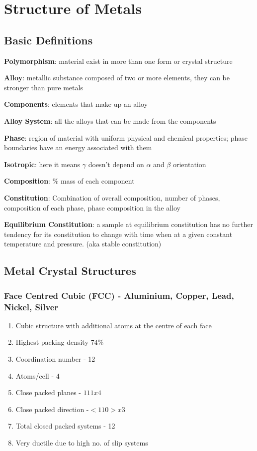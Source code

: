 \section{Structure of Metals}
\subsection{Basic Definitions}

\textbf{Polymorphism}: material exist in more than one form or crystal structure

\textbf{Alloy}: metallic substance composed of two or more elements, they can be stronger than pure metals

\textbf{Components}: elements that make up an alloy

\textbf{Alloy System}: all the alloys that can be made from the components

\textbf{Phase}: region of material with uniform physical and chemical properties; phase boundaries have an energy associated with them

\textbf{Isotropic}: here it means $\gamma$ doesn't depend on $\alpha$ and $\beta$ orientation

\textbf{Composition}: \% mass of each component

\textbf{Constitution}: Combination of overall composition, number of phases, composition of each phase, phase composition in the alloy

\textbf{Equilibrium Constitution}: a sample at equilibrium constitution has no further tendency for its constitution to change with time when at a given constant temperature and pressure. (aka stable constitution)

\subsection{Metal Crystal Structures} %
\label{sub:metal_crystal_structures}


\subsubsection{Face Centred Cubic (FCC) - Aluminium, Copper, Lead, Nickel, Silver}
\begin{enumerate}
  \item Cubic structure with additional atoms at the centre of each face
  \item Highest packing density $74\%$
  \item Coordination number - 12
  \item Atoms/cell - 4
  \item Close packed planes - ${111} x 4$
  \item Close packed direction -$ <110> x 3$
  \item Total closed packed systems - 12
  \item Very ductile due to high no. of slip systems
\end{enumerate}

